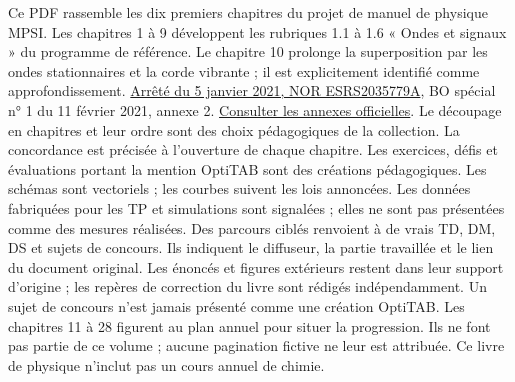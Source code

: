 \thispagestyle{mpsiFront}
Ce PDF rassemble les dix premiers chapitres du projet de manuel de physique MPSI. Les chapitres 1 à 9 développent les rubriques 1.1 à 1.6 « Ondes et signaux » du programme de référence. Le chapitre 10 prolonge la superposition par les ondes stationnaires et la corde vibrante ; il est explicitement identifié comme approfondissement.
\href{https://www.education.gouv.fr/bo/21/Special1/ESRS2035779A.htm}{Arrêté du 5 janvier 2021, NOR ESRS2035779A}, BO spécial n° 1 du 11 février 2021, annexe 2. \href{https://cache.media.education.gouv.fr/file/SPE1-MEN-MESRI-4-2-2021/64/8/spe779_annexe_1373648.pdf}{Consulter les annexes officielles}. Le découpage en chapitres et leur ordre sont des choix pédagogiques de la collection. La concordance est précisée à l’ouverture de chaque chapitre.
Les exercices, défis et évaluations portant la mention OptiTAB sont des créations pédagogiques. Les schémas sont vectoriels ; les courbes suivent les lois annoncées. Les données fabriquées pour les TP et simulations sont signalées ; elles ne sont pas présentées comme des mesures réalisées.
Des parcours ciblés renvoient à de vrais TD, DM, DS et sujets de concours. Ils indiquent le diffuseur, la partie travaillée et le lien du document original. Les énoncés et figures extérieurs restent dans leur support d’origine ; les repères de correction du livre sont rédigés indépendamment. Un sujet de concours n’est jamais présenté comme une création OptiTAB.
Les chapitres 11 à 28 figurent au plan annuel pour situer la progression. Ils ne font pas partie de ce volume ; aucune pagination fictive ne leur est attribuée. Ce livre de physique n’inclut pas un cours annuel de chimie.
\vfill{}


